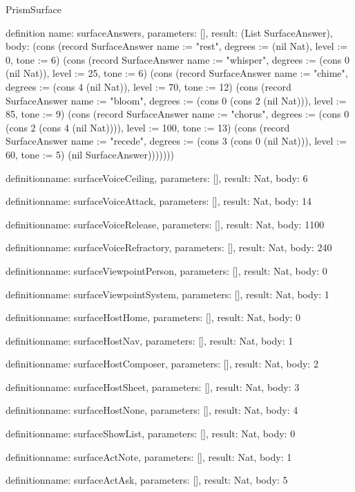 \begin{lexlean}{PrismSurface}
\begin{semanticmodule}
definition{
  name: surfaceAnswers,
  parameters: [],
  result: (List SurfaceAnswer),
  body: (cons (record SurfaceAnswer {name := "rest", degrees := (nil Nat), level := 0, tone := 6}) (cons (record SurfaceAnswer {name := "whisper", degrees := (cons 0 (nil Nat)), level := 25, tone := 6}) (cons (record SurfaceAnswer {name := "chime", degrees := (cons 4 (nil Nat)), level := 70, tone := 12}) (cons (record SurfaceAnswer {name := "bloom", degrees := (cons 0 (cons 2 (nil Nat))), level := 85, tone := 9}) (cons (record SurfaceAnswer {name := "chorus", degrees := (cons 0 (cons 2 (cons 4 (nil Nat)))), level := 100, tone := 13}) (cons (record SurfaceAnswer {name := "recede", degrees := (cons 3 (cons 0 (nil Nat))), level := 60, tone := 5}) (nil SurfaceAnswer)))))))
}

definition{name: surfaceVoiceCeiling, parameters: [], result: Nat, body: 6}

definition{name: surfaceVoiceAttack, parameters: [], result: Nat, body: 14}

definition{name: surfaceVoiceRelease, parameters: [], result: Nat, body: 1100}

definition{name: surfaceVoiceRefractory, parameters: [], result: Nat, body: 240}

definition{name: surfaceViewpointPerson, parameters: [], result: Nat, body: 0}

definition{name: surfaceViewpointSystem, parameters: [], result: Nat, body: 1}

definition{name: surfaceHostHome, parameters: [], result: Nat, body: 0}

definition{name: surfaceHostNav, parameters: [], result: Nat, body: 1}

definition{name: surfaceHostComposer, parameters: [], result: Nat, body: 2}

definition{name: surfaceHostSheet, parameters: [], result: Nat, body: 3}

definition{name: surfaceHostNone, parameters: [], result: Nat, body: 4}

definition{name: surfaceShowList, parameters: [], result: Nat, body: 0}

definition{name: surfaceActNote, parameters: [], result: Nat, body: 1}

definition{name: surfaceActAsk, parameters: [], result: Nat, body: 5}
\end{semanticmodule}
\end{lexlean}
